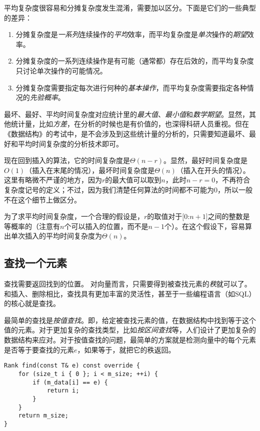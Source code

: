 平均复杂度很容易和分摊复杂度发生混淆，需要加以区分。下面是它们的一些典型的差异：
\begin{enumerate}
    \item 分摊复杂度是\textit{一系列}连续操作的\textit{平均}效率，而平均复杂度是\textit{单次}操作的\textit{期望}效率。
    \item 分摊复杂度的一系列连续操作是有可能（通常都）存在后效的，而平均复杂度只讨论单次操作的可能情况。
    \item 分摊复杂度需要指定每次进行何种的\textit{基本操作}，而平均复杂度需要指定各种情况的\textit{先验概率}。
\end{enumerate}

最坏、最好、平均时间复杂度对应统计里的\textit{最大值}、\textit{最小值}和\textit{数学期望}。显然，其他统计量，比如\textit{方差}，在分析的时候也是有价值的，也深得科研人员重视。但在《数据结构》的考试中，是不会涉及到这些统计量的分析的，只需要知道最坏、最好和平均时间复杂度的分析技术即可。

现在回到插入的算法，它的时间复杂度是$\Theta(n-r)$。显然，最好时间复杂度是$O(1)$（插入在末尾的情况），最坏时间复杂度是$\Theta(n)$（插入在开头的情况）。这里有略微不严谨的地方，因为$r$的最大值可以取到$n$，此时$n-r=0$，不再符合复杂度记号的定义；不过，因为我们清楚任何算法的时间都不可能为0，所以一般不在这个细节上做区分。

为了求平均时间复杂度，一个合理的假设是，$r$的取值对于$[0$:$n+1]$之间的整数是等概率的（注意有$n$个可以插入的位置，而不是$n-1$个）。在这个假设下，容易算出单次插入的平均时间复杂度为$\Theta(n)$。

\subsection{查找一个元素}
\label{seg:查找一个元素}
查找需要返回找到的位置。
对向量而言，只需要得到被查找元素的\textit{秩}就可以了。
和插入、删除相比，查找具有更加丰富的灵活性，甚至于一些编程语言（如SQL）的核心就是查找。

最简单的查找是\textit{按值查找}。即，给定被查找元素的值，在数据结构中找到等于这个值的元素。对于更加复杂的查找类型，比如\textit{按区间查找}等，人们设计了更加复杂的数据结构来应对。对于按值查找的问题，最简单的方案就是检测向量中的每个元素是否等于要查找的元素$e$，如果等于，就把它的秩返回。

\begin{lstlisting}
Rank find(const T& e) const override {
    for (size_t i { 0 }; i < m_size; ++i) {
        if (m_data[i] == e) {
            return i;
        }
    }
    return m_size;
}
\end{lstlisting}

